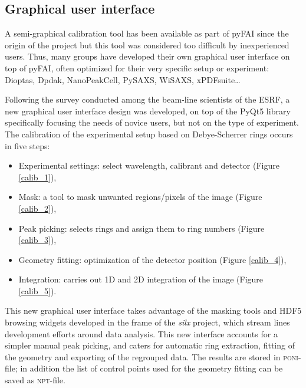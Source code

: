 \documentclass[preprint, pdf]{iucr}              %
\begin{document}
\subsection{Graphical user interface}

A semi-graphical calibration tool has been available as part of pyFAI
\cite{fv5028} since the origin of the project but this tool was considered too
difficult by inexperienced users.
Thus, many groups have developed their own graphical user interface on top of
pyFAI, often optimized for their very specific setup or experiment:
Dioptas\cite{dioptas}, Dpdak\cite{dpdak}, NanoPeakCell\cite{nanopeakcell},
PySAXS\cite{pysaxs}, WiSAXS, xPDFsuite\cite{xpdfsuite}\ldots

Following the survey conducted among the beam-line scientists of the ESRF, a
new graphical user interface design was developed, on top of the PyQt5 library
\cite{pyqt} specifically focusing the needs of novice users, but not on the
type of experiment.
The calibration of the experimental setup based on Debye-Scherrer rings 
occurs in five steps:
\begin{itemize}
  \item Experimental settings: select wavelength, calibrant and detector (Figure
  \ref{calib_1}),
  \item Mask: a tool to mask unwanted regions/pixels of the
  image (Figure \ref{calib_2}),
  \item Peak picking: selects rings and assign them to ring numbers (Figure
  \ref{calib_3}),
  \item Geometry fitting: optimization of the detector position (Figure
  \ref{calib_4}), 
  \item Integration: carries out 1D and 2D integration of the image (Figure
  \ref{calib_5}). 
\end{itemize}

This new graphical user interface takes advantage of the masking tools and HDF5
browsing widgets developed in the frame of the \textit{silx} \cite{silx}
project, which stream lines development efforts around data analysis.
This new interface accounts for a simpler manual peak picking, and caters for
automatic ring extraction, fitting of the geometry and exporting of the
regrouped data.
The results are stored in \textsc{poni}-file; in
addition the list of control points used for the geometry fitting can be saved as \textsc{npt}-file.
\end{document}
